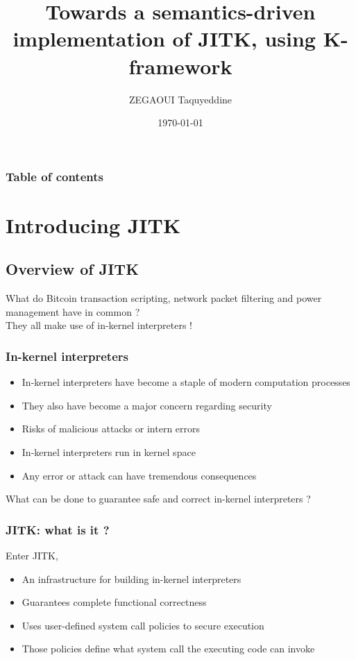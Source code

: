 \documentclass{beamer}
\begin{document}
\title{Towards a semantics-driven implementation of JITK, using K-framework}  
\author{ZEGAOUI Taquyeddine}
\date{\today} 
\begin{frame}
\titlepage
\end{frame}

\begin{frame}\frametitle{Table of contents}\tableofcontents
\end{frame} 


\section{Introducing JITK} 

\subsection{Overview of JITK}

\begin{frame}
What do Bitcoin transaction scripting, network packet filtering  and power management have in common ?
\\
\pause
They all make use of in-kernel interpreters !
\end{frame}

\begin{frame}\frametitle{In-kernel interpreters}
\begin{itemize}[<+->]
	\item In-kernel interpreters have become a staple of modern computation processes
	\item They also have become a major concern regarding security
	\item Risks of malicious attacks or intern errors
	\item In-kernel interpreters run in kernel space
	\item Any error or attack can have tremendous consequences
 \end{itemize}
\pause
What can be done to guarantee safe and correct in-kernel interpreters ?
\end{frame}

\begin{frame}\frametitle{JITK: what is it ?}
Enter JITK,
\begin{itemize}[<+->]
	\item An infrastructure for building in-kernel interpreters
	\item Guarantees complete functional correctness
	\item Uses user-defined system call policies to secure execution
	\item Those policies define what system call the executing code can invoke
 \end{itemize}
\end{frame}
\end{document}
